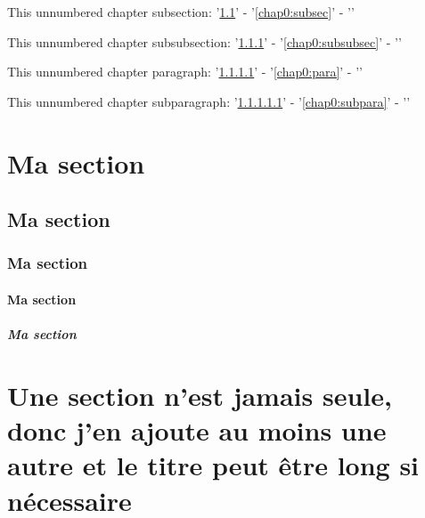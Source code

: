 \documentclass{polytech/polytech}
\begin{document}
This unnumbered chapter subsection: '\ref{chap0:subsec}' - '\autoref{chap0:subsec}' - ''

This unnumbered chapter subsubsection: '\ref{chap0:subsubsec}' - '\autoref{chap0:subsubsec}' - ''

This unnumbered chapter paragraph: '\ref{chap0:para}' - '\autoref{chap0:para}' - ''

This unnumbered chapter subparagraph: '\ref{chap0:subpara}' - '\autoref{chap0:subpara}' - ''
              

\lipsum[1-5]

\section{Ma section}

\label{chap0:sec}

\lipsum[1-3]

\subsection{Ma section}

\label{chap0:subsec}

\lipsum[1-3]

\subsubsection{Ma section}

\label{chap0:subsubsec}

\lipsum[1-3]

\paragraph{Ma section}

\label{chap0:para}

\lipsum[1-3]

\subparagraph{Ma section}

\label{chap0:subpara}

\lipsum[1-3]

\section{Une section n'est jamais seule, donc j'en ajoute au moins une autre et le titre peut être long si nécessaire}

\lipsum[1-3]
                       
\end{document}

